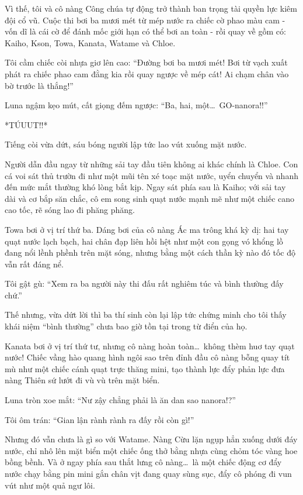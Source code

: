 \documentclass[../main.tex]{subfiles}
\begin{document}
Vì thế, tôi và cô nàng Công chúa tự động trở thành ban trọng tài quyền lực kiêm đội cổ vũ. Cuộc thi bơi ba mươi mét từ mép nước ra chiếc cờ phao màu cam - vốn dĩ là cái cờ để đánh mốc giới hạn có thể bơi an toàn - rồi quay về gồm có: Kaiho, Kson, Towa, Kanata, Watame và Chloe.

Tôi cầm chiếc còi nhựa giơ lên cao: ``Đường bơi ba mươi mét! Bơi từ vạch xuất phát ra chiếc phao cam đằng kia rồi quay ngược về mép cát! Ai chạm chân vào bờ trước là thắng!''

Luna ngậm kẹo mút, cất giọng đếm ngược: ``Ba, hai, một\dots\ GO-nanora!!''

*TÚUUT!!*

Tiếng còi vừa dứt, sáu bóng người lập tức lao vút xuống mặt nước.

Người dẫn đầu ngay từ những sải tay đầu tiên không ai khác chính là Chloe. Con cá voi sát thủ trườn đi như một mũi tên xé toạc mặt nước, uyển chuyển và nhanh đến mức mắt thường khó lòng bắt kịp. Ngay sát phía sau là Kaiho; với sải tay dài và cơ bắp săn chắc, cô em song sinh quạt nước mạnh mẽ như một chiếc cano cao tốc, rẽ sóng lao đi phăng phăng.

Towa bơi ở vị trí thứ ba. Dáng bơi của cô nàng Ác ma trông khá kỳ dị: hai tay quạt nước lạch bạch, hai chân đạp liên hồi hệt như một con gọng vó khổng lồ đang nổi lềnh phềnh trên mặt sóng, nhưng bằng một cách thần kỳ nào đó tốc độ vẫn rất đáng nể.

Tôi gật gù: ``Xem ra ba người này thi đấu rất nghiêm túc và bình thường đấy chứ.''

Thế nhưng, vừa dứt lời thì ba thí sinh còn lại lập tức chứng minh cho tôi thấy khái niệm ``bình thường'' chưa bao giờ tồn tại trong từ điển của họ.

Kanata bơi ở vị trí thứ tư, nhưng cô nàng hoàn toàn\dots\ không thèm huơ tay quạt nước! Chiếc vầng hào quang hình ngôi sao trên đỉnh đầu cô nàng bỗng quay tít mù như một chiếc cánh quạt trực thăng mini, tạo thành lực đẩy phản lực đưa nàng Thiên sứ lướt đi vù vù trên mặt biển.

Luna tròn xoe mắt: ``Nư zậy chẳng phải là ăn dan sao nanora!?''

Tôi ôm trán: ``Gian lận rành rành ra đấy rồi còn gì!''

Nhưng đó vẫn chưa là gì so với Watame. Nàng Cừu lặn ngụp hẳn xuống dưới đáy nước, chỉ nhô lên mặt biển một chiếc ống thở bằng nhựa cùng chỏm tóc vàng hoe bồng bềnh. Và ở ngay phía sau thắt lưng cô nàng\dots\ là một chiếc động cơ đẩy nước chạy bằng pin mini gắn chân vịt đang quay sùng sục, đẩy cô phóng đi vun vút như một quả ngư lôi.
\end{document}
